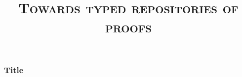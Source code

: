 \documentclass[professionalfonts,10pt,francais]{beamer}
\title{\textsc{Towards typed repositories of proofs}
\\
\textrm{}
}
\author{}
\date{}
\begin{document}
\maketitle

\begin{frame}
\frametitle{Title}
\end{frame}
\end{document}
